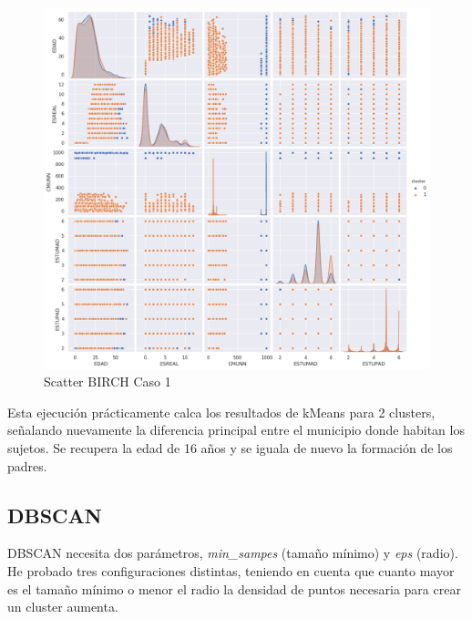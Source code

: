 \begin{figure}[H] %
	\centering
	\includegraphics[scale=0.4]{birch-1.png}  %
	\caption{Scatter BIRCH Caso 1} 
	\label{fig:sc-br-caso1}
\end{figure}

Esta ejecución prácticamente calca los resultados de kMeans para 2 clusters, señalando nuevamente la diferencia principal entre el municipio donde habitan los sujetos. Se recupera la edad de 16 años y se iguala de nuevo la formación de los padres.

\subsection{DBSCAN}

DBSCAN necesita dos parámetros, \textit{min\_sampes} (tamaño mínimo) y \textit{eps} (radio). He probado tres configuraciones distintas, teniendo en cuenta que cuanto mayor es el tamaño mínimo o menor el radio la densidad de puntos necesaria para crear un cluster aumenta.

